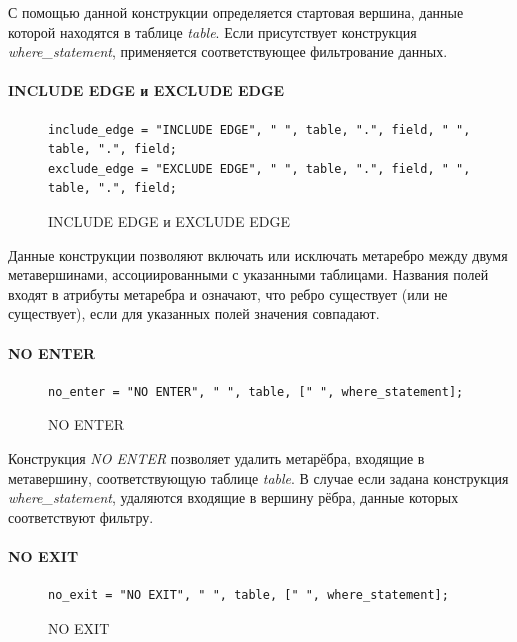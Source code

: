 С помощью данной конструкции определяется стартовая вершина, данные которой находятся в таблице \textit{table}. Если присутствует конструкция \textit{where\_statement}, применяется соответствующее фильтрование данных.

\paragraph{INCLUDE EDGE и EXCLUDE EDGE}

\begin{figure}
  \begin{lstlisting}
include_edge = "INCLUDE EDGE", " ", table, ".", field, " ", table, ".", field;
exclude_edge = "EXCLUDE EDGE", " ", table, ".", field, " ", table, ".", field;
  \end{lstlisting}
  \caption{INCLUDE EDGE и EXCLUDE EDGE}
  \label{symbol-include-exclude-edge}
\end{figure}

Данные конструкции позволяют включать или исключать метаребро между двумя метавершинами, ассоциированными с указанными таблицами. Названия полей входят в атрибуты метаребра и означают, что ребро существует (или не существует), если для указанных полей значения совпадают.

\paragraph{NO ENTER}

\begin{figure}
  \begin{lstlisting}
no_enter = "NO ENTER", " ", table, [" ", where_statement];
  \end{lstlisting}
  \caption{NO ENTER}
  \label{symbol-no-enter}
\end{figure}

Конструкция \textit{NO ENTER} позволяет удалить метарёбра, входящие в метавершину, соответствующую таблице \textit{table}. В случае если задана конструкция \textit{where\_statement}, удаляются входящие в вершину рёбра, данные которых соответствуют фильтру.

\paragraph{NO EXIT}

\begin{figure}
  \begin{lstlisting}
no_exit = "NO EXIT", " ", table, [" ", where_statement];
  \end{lstlisting}
  \caption{NO EXIT}
  \label{symbol-no-exit}
\end{figure}

